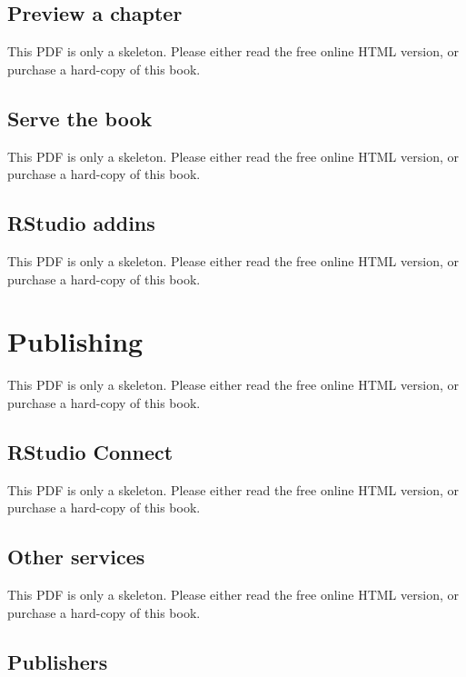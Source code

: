 \documentclass[
  11pt,
]{krantz}
\theoremstyle{definition}
\theoremstyle{definition}
\theoremstyle{definition}
\theoremstyle{definition}
\theoremstyle{remark}
\begin{document}
\subsection{Preview a chapter}\label{preview-a-chapter}

This PDF is only a skeleton. Please either read the free online HTML version, or purchase a hard-copy of this book.

\subsection{Serve the book}\label{serve-the-book}

This PDF is only a skeleton. Please either read the free online HTML version, or purchase a hard-copy of this book.

\subsection{RStudio addins}\label{rstudio-addins}

This PDF is only a skeleton. Please either read the free online HTML version, or purchase a hard-copy of this book.

\section{Publishing}\label{bookdown-publish}

This PDF is only a skeleton. Please either read the free online HTML version, or purchase a hard-copy of this book.

\subsection{RStudio Connect}\label{rstudio-connect}

This PDF is only a skeleton. Please either read the free online HTML version, or purchase a hard-copy of this book.

\subsection{Other services}\label{other-services}

This PDF is only a skeleton. Please either read the free online HTML version, or purchase a hard-copy of this book.

\subsection{Publishers}\label{publishers}
\end{document}
